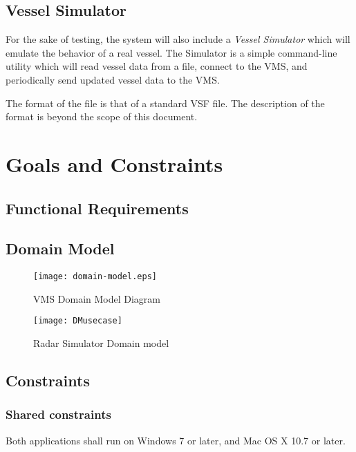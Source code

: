 \documentclass{article}
\begin{document}
\subsection{Vessel Simulator}

For the sake of testing, the system will also include a \emph{Vessel Simulator} which will emulate the behavior of a real vessel. The Simulator is a simple command-line utility which will read vessel data from a file, connect to the VMS, and periodically send updated vessel data to the VMS.

The format of the file is that of a standard VSF file. The description of the format is beyond the scope of this document.

\break
\section{Goals and Constraints} %

\subsection{Functional Requirements} %





\subsection{Domain Model} %

\begin{figure}[h]
\caption{VMS Domain Model Diagram}
\texttt{[image: domain-model.eps]}
\end{figure}

\begin{figure}[h]
\caption{Radar Simulator Domain model}
\texttt{[image: DMusecase]}
\end{figure}

\subsection{Constraints} %

\subsubsection{Shared constraints}
Both applications shall run on Windows 7 or later, and Mac OS X 10.7 or later.
\end{document}
